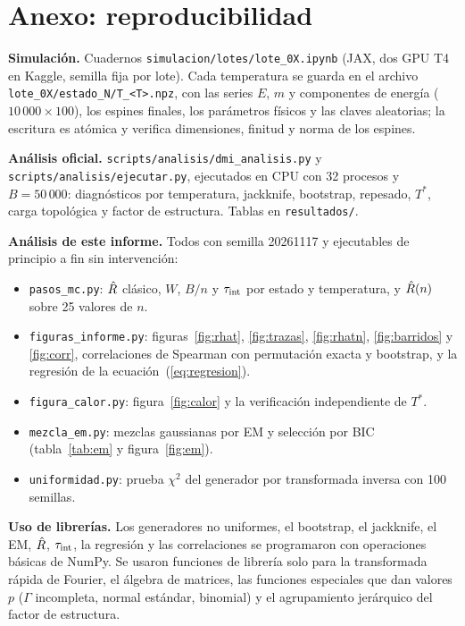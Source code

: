 \section{Anexo: reproducibilidad}

\textbf{Simulación.} Cuadernos \texttt{simulacion/lotes/lote\_0X.ipynb} (JAX, dos GPU T4 en Kaggle, semilla fija por lote). Cada temperatura se guarda en el archivo\\ \texttt{lote\_0X/estado\_N/T\_<T>.npz}, con las series $E$, $m$ y componentes de energía ($10\,000\times100$), los espines finales, los parámetros físicos y las claves aleatorias; la escritura es atómica y verifica dimensiones, finitud y norma de los espines.

\textbf{Análisis oficial.} \texttt{scripts/analisis/dmi\_analisis.py} y \texttt{scripts/analisis/ejecutar.py}, ejecutados en CPU con 32 procesos y $B=50\,000$: diagnósticos por temperatura, jackknife, bootstrap, repesado, $T^*$, carga topológica y factor de estructura. Tablas en \texttt{resultados/}.

\textbf{Análisis de este informe.} Todos con semilla 20261117 y ejecutables de principio a fin sin intervención:
\begin{itemize}
\item \texttt{pasos\_mc.py}: $\hat R$ clásico, $W$, $B/n$ y $\tau_{\mathrm{int}}$ por estado y temperatura, y $\hat R(n)$ sobre 25 valores de $n$.
\item \texttt{figuras\_informe.py}: figuras~\ref{fig:rhat}, \ref{fig:trazas}, \ref{fig:rhatn}, \ref{fig:barridos} y \ref{fig:corr}, correlaciones de Spearman con permutación exacta y bootstrap, y la regresión de la ecuación~(\ref{eq:regresion}).
\item \texttt{figura\_calor.py}: figura~\ref{fig:calor} y la verificación independiente de $T^*$.
\item \texttt{mezcla\_em.py}: mezclas gaussianas por EM y selección por BIC (tabla~\ref{tab:em} y figura~\ref{fig:em}).
\item \texttt{uniformidad.py}: prueba $\chi^2$ del generador por transformada inversa con 100 semillas.
\end{itemize}

\textbf{Uso de librerías.} Los generadores no uniformes, el bootstrap, el jackknife, el EM, $\hat R$, $\tau_{\mathrm{int}}$, la regresión y las correlaciones se programaron con operaciones básicas de NumPy. Se usaron funciones de librería solo para la transformada rápida de Fourier, el álgebra de matrices, las funciones especiales que dan valores $p$ ($\Gamma$ incompleta, normal estándar, binomial) y el agrupamiento jerárquico del factor de estructura.

